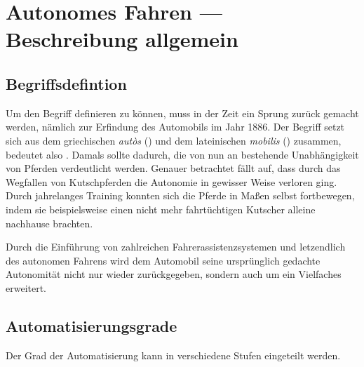 \chapter{Autonomes Fahren --- Beschreibung allgemein}
\section{Begriffsdefintion}
Um den Begriff  definieren zu können, muss in der Zeit ein Sprung zurück gemacht werden, nämlich zur Erfindung des Automobils im Jahr 1886. Der Begriff  setzt sich aus dem griechischen \textit{autòs} () und dem lateinischen \textit{mobilis} () zusammen, bedeutet also . Damals sollte dadurch, die von nun an bestehende Unabhängigkeit von Pferden verdeutlicht werden. Genauer betrachtet fällt auf, dass durch das Wegfallen von Kutschpferden die Autonomie in gewisser Weise verloren ging. Durch jahrelanges Training konnten sich die Pferde in Maßen selbst fortbewegen, indem sie beispielsweise einen nicht mehr fahrtüchtigen Kutscher alleine nachhause brachten.

Durch die Einführung von zahlreichen Fahrerassistenzsystemen und letzendlich des autonomen Fahrens wird dem Automobil seine ursprünglich gedachte Autonomität nicht nur wieder zurückgegeben, sondern auch um ein Vielfaches erweitert.


\section{Automatisierungsgrade}
Der Grad der Automatisierung kann in verschiedene Stufen eingeteilt werden.
